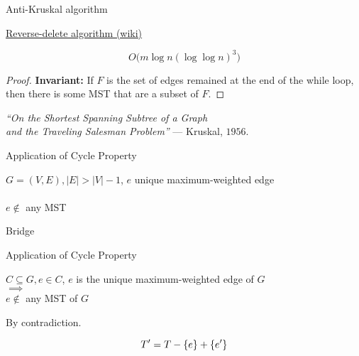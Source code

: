 \begin{frame}{}
  \begin{exampleblock}{Anti-Kruskal algorithm }
    \centerline{\href{https://en.wikipedia.org/wiki/Reverse-delete_algorithm}{Reverse-delete algorithm (wiki)}}

    \[
      O\Big(m \log n (\log \log n)^3\Big)
    \]
  \end{exampleblock}

  \pause
  \vspace{0.50cm}
  \begin{proof}
    \textbf{Invariant: } If $F$ is the set of edges remained at the end of the while loop, 
    then there is some MST that are a subset of $F$.
  \end{proof}

  \pause
  \vspace{0.50cm}
  \begin{center}
    {\it ``On the Shortest Spanning Subtree of a Graph \\
    and the Traveling Salesman Problem''} \qquad --- Kruskal, $1956$.
  \end{center}
\end{frame}

\begin{frame}{}
  \begin{exampleblock}{Application of Cycle Property }
    \begin{center}
      $G = (V, E), |E| > |V| - 1$, $e$ unique maximum-weighted edge \\[6pt]
       \\[6pt]
      $e \notin$ any MST
    \end{center}
  \end{exampleblock}

  \pause
  \vspace{0.60cm}
  \centerline{\large Bridge}
\end{frame}

\begin{frame}{}
  \begin{exampleblock}{Application of Cycle Property }
    \begin{center}
      $C \subseteq G, e \in C$, $e$ is the unique maximum-weighted edge of $G$ \\[6pt]
      $\implies$ \\[6pt]
      $e \notin$ any MST of $G$
    \end{center}
  \end{exampleblock}

  \pause
  \vspace{0.50cm}
  \centerline{By contradiction.}
  \[
    T' = T - \{e\} + \{e'\}
  \]
\end{frame}

